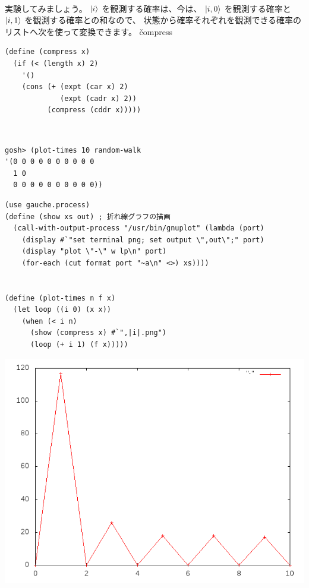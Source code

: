 \hline
\begin{minipage}{.01\hsize}
  ~
\end{minipage}
\begin{minipage}{.39\hsize}
  実験してみましょう。
  $| i \rangle$ を観測する確率は、今は、
  $| i,0 \rangle$ を観測する確率と
  $| i,1 \rangle$ を観測する確率との和なので、
  状態から確率それぞれを観測できる確率のリストへ次を使って変換できます。
  \v{compress}
\begin{verbatim}
(define (compress x)
  (if (< (length x) 2)
    '()
    (cons (+ (expt (car x) 2)
             (expt (cadr x) 2))
          (compress (cddr x)))))
\end{verbatim}
\end{minipage}
\begin{minipage}{.10\hsize}
  ~
\end{minipage}
\begin{minipage}{.39\hsize}
\begin{verbatim}
gosh> (plot-times 10 random-walk
'(0 0 0 0 0 0 0 0 0 0
  1 0
  0 0 0 0 0 0 0 0 0 0))
\end{verbatim}
\end{minipage}

\hline

  \begin{verbatim}
(use gauche.process)
(define (show xs out) ; 折れ線グラフの描画
  (call-with-output-process "/usr/bin/gnuplot" (lambda (port)
    (display #`"set terminal png; set output \",out\";" port)
    (display "plot \"-\" w lp\n" port)
    (for-each (cut format port "~a\n" <>) xs))))


(define (plot-times n f x)
  (let loop ((i 0) (x x))
    (when (< i n)
      (show (compress x) #`",|i|.png")
      (loop (+ i 1) (f x)))))
\end{verbatim}

\begin{center}
\includegraphics[width=1.0\textwidth,bb=0 0 640 480]{img/8.png}
\end{center}


